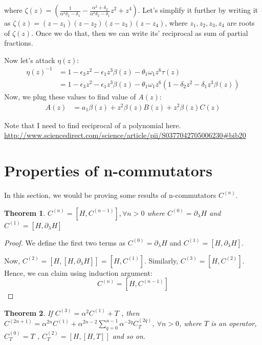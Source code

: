 \documentclass[11pt,a4paper]{article}
\newtheorem{thm}{Theorem}
\begin{document}
where $\zeta (z)= (\frac{1}{\alpha^2 \delta_2 -\delta_1} -\frac{\alpha^2 + \delta_2}{\alpha^2 \delta_2 -\delta_1} z^2 +  z^4)$. Let's simplify it further by writing it as $\zeta (z)= (z-z_1)(z-z_2)(z-z_3)(z-z_4)$, where $z_1, z_2, z_3,z_4$ are roots of $\zeta (z)$. Once we do that, then we can write its' reciprocal as sum of partial fractions. 


Now let's attack $\eta(z)$:
\begin{align*}
\eta(z)^{-1}&=1 - \epsilon_3 z^2 - \epsilon_1  z^3   \beta(z) -\theta_1   \omega_1  z^6 \tau(z)  \\
 &=1 - \epsilon_3 z^2 - \epsilon_1  z^3   \beta(z) -\theta_1   \omega_1  z^6 ( 1 - \delta_2 z^2 -\delta_1  z^3   \beta(z) ) 
\end{align*}
Now, we plug these values to find value of $A(z)$:
\begin{align}
A(z)  &=   a_1 \beta(z)   +  z^2 \beta(z) B(z) + z^2 \beta(z) C(z) 
\end{align}


Note that I need to find reciprocal of a polynomial here.
\url{http://www.sciencedirect.com/science/article/pii/S0377042705006230#bib20}

\section{Properties of n-commutators}\label{sec.Cn}
In this section, we would be proving some results of n-commutators $C^{(n)}$.

 
\begin{thm}
$C^{(n)}= [H, C^{(n-1)}],  \forall n>0$ where $C^{(0)}=  \partial_{\lambda}H$ and  $C^{(1)}= [H, \partial_{\lambda}H]$
\end{thm}
\begin{proof}
We define the first two terms  as $C^{(0)}=  \partial_{\lambda}H$ and $C^{(1)}= [H, \partial_{\lambda}H]$. 


Now, $C^{(2)}= [H,[H, \partial_{\lambda}H]]= [H, C^{(1)}]$. Similarly, $C^{(3)}=  [H, C^{(2)}]$. Hence, we can claim using induction argument:
\begin{equation}
C^{(n)}= [H, C^{(n-1)}]
\end{equation}
\end{proof}
 


\begin{thm}
If $C^{(3)}=  \alpha^2  C^{(1)} + T$ , then $C^{(2n+1)}= \alpha^{2n} C^{(1)} +\alpha^{2n-2} \sum_{q=0}^{n-1} \alpha^{-2q}C^{(2q)}_T $, $\forall n>0$,  where $T$ is an operator,  $ C^{(0)}_T=T$ , $C^{(2)}_T=[H, [H, T]]$ and so on.
\end{thm}
\end{document}
